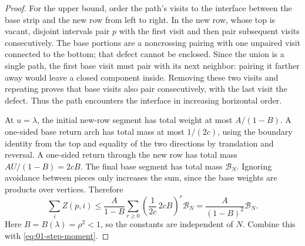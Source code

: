 \begin{proof}
For the upper bound, order the path's visits to the interface between
the base strip and the new row from left to right. In the new row,
whose top is vacant, disjoint intervals pair $p$ with the first visit
and then pair subsequent visits consecutively. The base portions are
a noncrossing pairing with one unpaired visit connected to the bottom;
that defect cannot be enclosed. Since the union is a single path,
the first base visit must pair with its next neighbor: pairing it
farther away would leave a closed component inside. Removing these
two visits and repeating proves that base visits also pair
consecutively, with the last visit the defect. Thus the path encounters
the interface in increasing horizontal order.

At $u=\lambda$, the initial new-row segment has total weight at most
$A/(1-B)$. A one-sided base return arch has total mass at most
$1/(2c)$, using the boundary identity from the top and equality of
the two directions by translation and reversal. A one-sided return
through the new row has total mass
$AU/(1-B)=2cB$. The final base segment has total mass
$\mathcal B_N$. Ignoring avoidance between pieces only increases the
sum, since the base weights are products over vertices. Therefore
\[
 \sum_iZ(p,i)
 \le\frac{A}{1-B}\sum_{r\ge0}
       \left(\frac1{2c}\,2cB\right)^r\mathcal B_N
 =\frac{A}{(1-B)^2}\mathcal B_N.
\]
Here $B=B(\lambda)=\rho^2<1$, so the constants are independent of
$N$. Combine this with \eqref{eq:01-step-moment}.
\end{proof}
